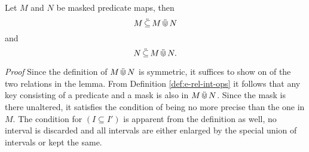 \begin{lemma}
    \label{lem:map-union-subsets}
    Let $M$ and $N$ be masked predicate maps, then
    \begin{equation*}
        M \,\ddot{\subseteq}\, M \,\ddot{\Cup}\, N
    \end{equation*}
    and
    \begin{equation*}
        N \,\ddot{\subseteq}\, M \,\ddot{\Cup}\, N.
    \end{equation*}
\end{lemma}
\textit{Proof}
Since the definition of $M \,\ddot{\Cup}\, N$ is symmetric, it suffices to show on of the two relations in the lemma.
From Definition \ref{def:e-rel-int-ops} it follows that any key consisting of a predicate and a mask is also in $M \,\ddot{\Cup}\, N$.
Since the mask is there unaltered, it satisfies the condition of being no more precise than the one in $M$.
The condition for $(I \subseteq I')$ is apparent from the definition as well, no interval is discarded and all intervals are either enlarged by the special union of intervals or kept the same.
